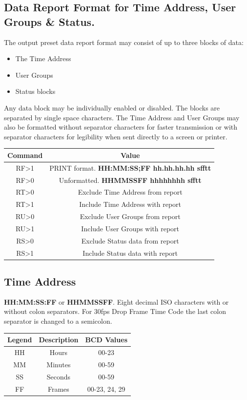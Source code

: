 \documentclass{article}
\begin{document}
	\subsection{Data Report Format for Time Address, User Groups \& Status.}\label{data-report-format-for-time-address-user-groups-status.}
		The output preset data report format may consist of up to three blocks of data:
		\begin{itemize}
			\item
			The Time Address
			\item
			User Groups
			\item
			Status blocks
		\end{itemize}
		Any data block may be individually enabled or disabled. The blocks are separated by single space characters. The Time Address and User Groups may also be formatted without separator characters for faster transmission or with separator characters for legibility when sent directly to a screen or printer.	
		\begin{center}
			\begin{tabular}{|c|c|}
				\hline
	       		Command & Value \\
				\hline
	       		RF\textgreater1 & PRINT format. \textbf{HH:MM:SS;FF hh.hh.hh.hh sfftt} \\ 
				RF\textgreater0 & Unformatted. \textbf{HHMMSSFF hhhhhhhh sfftt} \\ 
				RT\textgreater0 & Exclude Time Address from report \\ 
				RT\textgreater1 & Include Time Address with report \\ 
				RU\textgreater0 & Exclude User Groups from report \\ 
				RU\textgreater1 & Include User Groups with report \\ 
				RS\textgreater0 & Exclude Status data from report \\ 
				RS\textgreater1 & Include Status data with report \\ 
				\hline
			\end{tabular}
		\end{center}
	
	\subsection{Time Address}\label{time-address}
		\textbf{HH:MM:SS:FF} or \textbf{HHMMSSFF}.
		Eight decimal ISO characters with or without colon separators. For 30fps Drop Frame Time Code the last colon separator is changed to a semicolon.	
		\begin{center}
			\begin{tabular}{|c|c|c|}
				\hline
				Legend & Description & BCD Values \\
				\hline
				HH & Hours & 00-23 \\
				MM & Minutes & 00-59 \\
				SS & Seconds & 00-59 \\
				FF & Frames & 00-23, 24, 29 \\
				\hline
			\end{tabular}
		\end{center}
	
\end{document}
